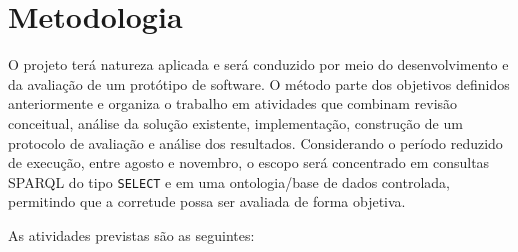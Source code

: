 \documentclass[10pt,a4paper]{article}
\begin{document}
\section{Metodologia}

O projeto terá natureza aplicada e será conduzido por meio do desenvolvimento e da avaliação de um protótipo de software. O método parte dos objetivos definidos anteriormente e organiza o trabalho em atividades que combinam revisão conceitual, análise da solução existente, implementação, construção de um protocolo de avaliação e análise dos resultados. Considerando o período reduzido de execução, entre agosto e novembro, o escopo será concentrado em consultas SPARQL do tipo \texttt{SELECT} e em uma ontologia/base de dados controlada, permitindo que a corretude possa ser avaliada de forma objetiva.

As atividades previstas são as seguintes:
\end{document}
